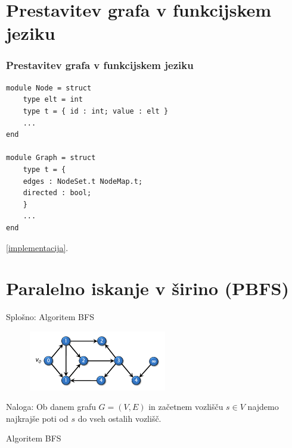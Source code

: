 \documentclass{beamer}
\begin{document}
\section{Prestavitev grafa v funkcijskem jeziku}

\begin{frame}[fragile]
    \frametitle{Prestavitev grafa v funkcijskem jeziku}
\begin{verbatim}
module Node = struct
    type elt = int
    type t = { id : int; value : elt }
    ...
end

module Graph = struct
    type t = {
    edges : NodeSet.t NodeMap.t;
    directed : bool;
    }
    ...
end
    \end{verbatim}
        
    \href{https://github.com/tjazerzen/parallelisation-of-graph-algorithms-in-functional-programming-languages/blob/master/playground/graph/graph.ml}{[implementacija]}.
\end{frame}

\section{Paralelno iskanje v širino (PBFS)}

\begin{frame}{Splošno: Algoritem BFS}
    \begin{figure}
        \centering
        \includegraphics[width=6cm]{slike/parallel_bfs/pbfs_graph_example.png}
        \label{fig:pbfs_graph_example}
    \end{figure}
    Naloga: Ob danem grafu $G=(V, E)$ in začetnem vozlišču $s \in V$ najdemo najkrajše poti od $s$ do vseh ostalih vozlišč.
\end{frame}

\begin{frame}{Algoritem BFS}
    \begin{algorithm}[H]
      \SetAlgoLined
      \DontPrintSemicolon
      \label{alg:non_parallel_bfs}
    \end{algorithm}
  \end{frame}
  
\end{document}
